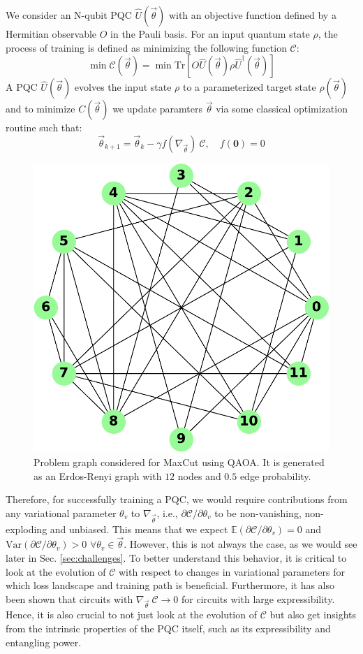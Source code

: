 \documentclass[%
 reprint,
 amsmath,
 amssymb,
 showkeys,
 pra,
 floatfix,
]{revtex4-2}
\begin{document}
We consider an N-qubit PQC $\hat{U}(\vec{\theta})$ with an objective function defined by a Hermitian observable $O$ in the Pauli basis. For an input quantum state $\rho$, the process of training is defined as minimizing the following function $\mathcal{C}$:
\begin{equation}
	\min \mathcal{C}(\vec{\theta}) = \min \text{Tr}[O \hat{U}(\vec{\theta}) \rho \hat{U}^{\dagger}(\vec{\theta})]
\end{equation}
A PQC $\hat{U}(\vec{\theta})$ evolves the input state $\rho$ to a parameterized target state $\rho(\vec{\theta})$ and to minimize $C(\vec{\theta})$ we update paramters $\vec{\theta}$ via some classical optimization routine such that:
\begin{equation}
	\vec{\theta}_{k+1} = \vec{\theta}_k - \gamma f(\nabla_{\vec{\theta}})\ \mathcal{C}, \quad f(\textbf{0})= 0 
\end{equation}
\begin{figure}[!tp]
    \centering
    \includegraphics[width=0.6\linewidth]{images/qaoa-graph.pdf}
    \caption[Problem graph for QAOA]{Problem graph considered for MaxCut using QAOA. It is generated as an Erdos-Renyi graph with $12$ nodes and $0.5$ edge probability.}
    \label{fig:qoao-maxcut-graph}
\end{figure}
Therefore, for successfully training a PQC, we would require contributions from any variational parameter $\theta_v$ to $\nabla_{\vec{\theta}}$, i.e., $\partial\mathcal{C}/\partial\theta_v$ to be non-vanishing, non-exploding and unbiased. This means that we expect $\mathbb{E}(\partial\mathcal{C}/\partial\theta_v) = 0$ and $\text{Var}(\partial\mathcal{C}/\partial\theta_v) > 0$  $\forall \theta_v \in \vec{\theta}$. However, this is not always the case, as we would see later in Sec. \ref{sec:challenges}. To better understand this behavior, it is critical to look at the evolution of $\mathcal{C}$ with respect to changes in variational parameters for which loss landscape and training path is beneficial. Furthermore, it has also been shown that circuits with $\nabla_{\vec{\theta}}\ \mathcal{C} \rightarrow 0$ for circuits with large expressibility. Hence, it is also crucial to not just look at the evolution of $\mathcal{C}$ but also get insights from the intrinsic properties of the PQC itself, such as its expressibility and entangling power.
\end{document}
